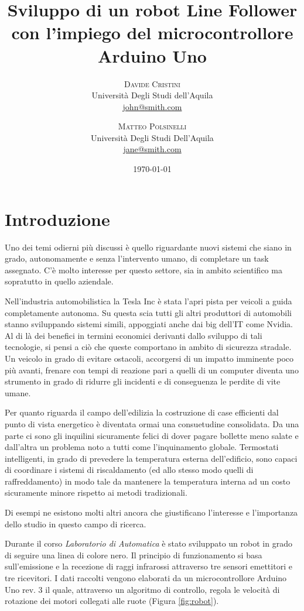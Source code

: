 \documentclass[twoside,twocolumn]{article}
\title{Sviluppo di un robot Line Follower con l'impiego del microcontrollore Arduino Uno} %
\author{%
\textsc{Davide Cristini} \\[1ex] %
\normalsize Università Degli Studi dell'Aquila \\ %
\normalsize \href{mailto:john@smith.com}{john@smith.com} 
\and 
\textsc{Matteo Polsinelli} \\[1ex]
\normalsize Università Degli Studi Dell'Aquila \\ 
\normalsize \href{mailto:polsinellimatteo91@gmail.com}{jane@smith.com}
}
\date{\today} %
\begin{document}
\maketitle


\section{Introduzione}
Uno dei temi odierni più discussi è quello riguardante nuovi sistemi che siano in grado, autonomamente e senza l'intervento umano, di completare un task assegnato.
C'è molto interesse per questo settore, sia in ambito scientifico ma sopratutto in quello aziendale. 

Nell'industria automobilistica la Tesla Inc è stata l'apri pista per veicoli a guida completamente autonoma. Su questa scia tutti gli altri produttori di automobili stanno sviluppando sistemi simili, appoggiati anche dai big dell'IT come Nvidia. Al di là dei benefici in termini economici derivanti dallo sviluppo di tali tecnologie, si pensi a ciò che queste comportano in ambito di sicurezza stradale. Un veicolo in grado di evitare ostacoli, accorgersi di un impatto imminente poco più avanti, frenare con tempi di reazione pari a quelli di un  computer diventa uno strumento in grado di ridurre gli incidenti e di conseguenza le perdite di vite umane. 

Per quanto riguarda il campo dell'edilizia la costruzione di case efficienti dal punto di vista energetico è diventata ormai una consuetudine consolidata. Da una parte ci sono gli inquilini sicuramente felici di dover pagare bollette meno salate e dall'altra un problema noto a tutti come l'inquinamento globale. Termostati intelligenti, in grado di prevedere la temperatura esterna dell'edificio, sono capaci di coordinare i sistemi di riscaldamento (ed allo stesso modo quelli di raffreddamento) in modo tale da mantenere la temperatura interna ad un costo sicuramente minore rispetto ai metodi tradizionali.

Di esempi ne esistono molti altri ancora che giustificano l'interesse e l'importanza dello studio in questo campo di ricerca.

Durante il corso \textit{Laboratorio di Automatica} è stato sviluppato un robot in grado di seguire una linea di colore nero. Il principio di funzionamento si basa sull'emissione e la recezione di raggi infrarossi attraverso tre sensori emettitori e tre ricevitori. I dati raccolti vengono elaborati da un microcontrollore Arduino Uno rev. 3 il quale, attraverso un algoritmo di controllo, regola le velocità di rotazione dei motori collegati alle ruote (Figura \ref{fig:robot}).
\end{document}
